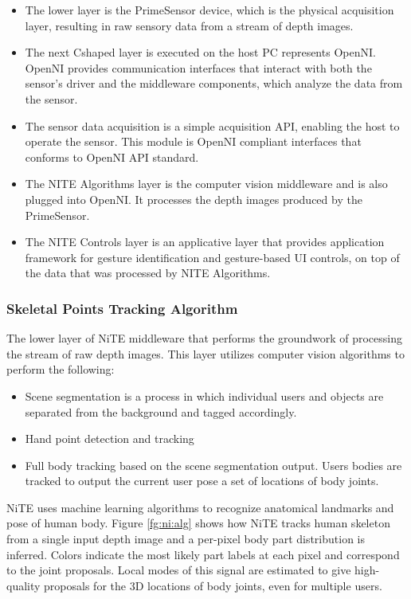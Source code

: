 \begin{itemize}
	\item The lower layer is the PrimeSensor device, which is the physical acquisition layer, resulting in raw sensory data from a stream of depth images. 
	\item The next Cshaped layer is executed on the host PC represents OpenNI. OpenNI provides communication interfaces that interact with both the sensor's driver and the middleware components, which analyze the data from the sensor. 
	\item The sensor data acquisition is a simple acquisition API, enabling the host to operate the sensor. This module is OpenNI compliant interfaces that conforms to OpenNI API standard. 
	\item The NITE Algorithms layer is the computer vision middleware and is also plugged into OpenNI. It processes the depth images produced by the PrimeSensor. 
	\item The NITE Controls layer is an applicative layer that provides application framework for gesture identification and gesture-based UI controls, on top of the data that was processed by NITE Algorithms. 
\end{itemize}

\subsubsection{Skeletal Points Tracking Algorithm} The lower layer of NiTE middleware that performs the groundwork of processing the stream of raw depth images. This layer utilizes computer vision algorithms to perform the following: 
\begin{itemize}
	\item Scene segmentation is a process in which individual users and objects are separated from the background and tagged accordingly. 
	\item Hand point detection and tracking 
	\item Full body tracking based on the scene segmentation output. Users bodies are tracked to output the current user pose a set of locations of body joints. 
\end{itemize}

NiTE uses machine learning algorithms to recognize anatomical landmarks and pose of human body. Figure \ref{fg:ni:alg} shows how NiTE tracks human skeleton from a single input depth image and a per-pixel body part distribution is inferred. Colors indicate the most likely part labels at each pixel and correspond to the joint proposals. Local modes of this signal are estimated to give high-quality proposals for the 3D locations of body joints, even for multiple users.

